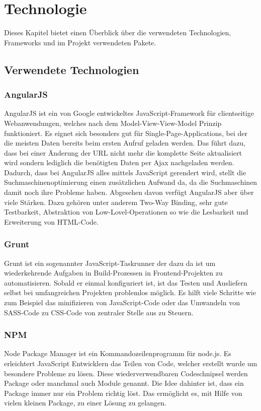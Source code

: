 \chapter{Technologie}
\label{chap_2}

Dieses Kapitel bietet einen Überblick über die verwendeten Technologien, Frameworks und im Projekt verwendeten Pakete.

\section{Verwendete Technologien}
\subsection{AngularJS}
AngularJS ist ein von Google entwickeltes JavaScript-Framework für clientseitige Webanwendungen, welches nach dem Model-View-View-Model Prinzip funktioniert. Es eignet sich besonders gut für Single-Page-Applications, bei der die meisten Daten bereits beim ersten Aufruf geladen werden. Das führt dazu, dass bei einer Änderung der URL nicht mehr die komplette Seite aktualisiert wird sondern lediglich die benötigten Daten per Ajax nachgeladen werden. Dadurch, dass bei AngularJS alles mittels JavaScript gerendert wird, stellt die Suchmaschinenoptimierung einen zusätzlichen Aufwand da, da die Suchmaschinen damit noch ihre Probleme haben. Abgesehen davon verfügt AngularJS aber über viele Stärken. Dazu gehören unter anderem Two-Way Binding, sehr gute Testbarkeit, Abstraktion von Low-Lovel-Operationen so wie die Lesbarkeit und Erweiterung von HTML-Code. 

\subsection{Grunt}
Grunt ist ein sogenannter JavaScript-Taskrunner der dazu da ist um wiederkehrende Aufgaben in Build-Prozessen in Frontend-Projekten zu automatisieren. Sobald er einmal konfiguriert ist, ist das Testen und Ausliefern selbst bei umfangreichen Projekten problemlos möglich. Es hilft viele Schritte wie zum Beispiel das minifizieren von JavaScript-Code oder das Umwandeln von SASS-Code zu CSS-Code von zentraler Stelle aus zu Steuern. 

\subsection{NPM}
Node Package Manager ist ein Kommandozeilenprogramm für node.js. Es erleichtert JavaScript Entwicklern das Teilen von Code, welcher erstellt wurde um besondere Probleme zu lösen. Diese wiederverwendbaren Codeschnipsel werden Package oder manchmal auch Module genannt. Die Idee dahinter ist, dass ein Package immer nur ein Problem richtig löst. Das ermöglicht es, mit Hilfe von vielen kleinen Package, zu einer Lösung zu gelangen.
  
